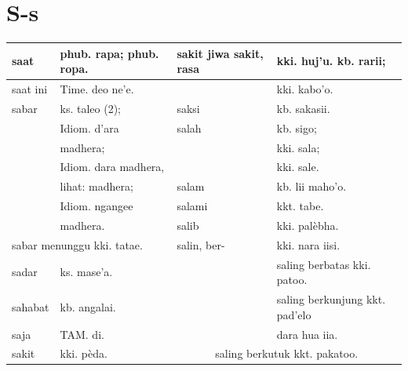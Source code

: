 \documentclass[10pt]{article}
\begin{document}
\section*{S-s}
\begin{center}
\begin{tabular}{|l|l|l|l|}
\hline
saat & phub. rapa; phub. ropa. & sakit jiwa sakit, rasa & kki. huj'u. kb. rarii; \\
\hline
saat ini & Time. deo ne'e. &  & kki. kabo'o. \\
\hline
sabar & ks. taleo (2); & saksi & kb. sakasii. \\
\hline
 & Idiom. d'ara & salah & kb. sigo; \\
\hline
 & madhera; &  & kki. sala; \\
\hline
 & Idiom. dara madhera, &  & kki. sale. \\
\hline
 & lihat: madhera; & salam & kb. lii maho'o. \\
\hline
 & Idiom. ngangee & salami & kkt. tabe. \\
\hline
 & madhera. & salib & kki. palèbha. \\
\hline
\multicolumn{2}{|l|}{sabar menunggu kki. tatae.} & salin, ber- & kki. nara iisi. \\
\hline
sadar & ks. mase'a. &  & saling berbatas kki. patoo. \\
\hline
sahabat & kb. angalai. &  & saling berkunjung kkt. pad'elo \\
\hline
saja & TAM. di. &  & dara hua iia. \\
\hline
sakit & kki. pèda. & \multicolumn{2}{|c|}{saling berkutuk kkt. pakatoo.} \\
\hline
\end{tabular}
\end{center}
\end{document}
